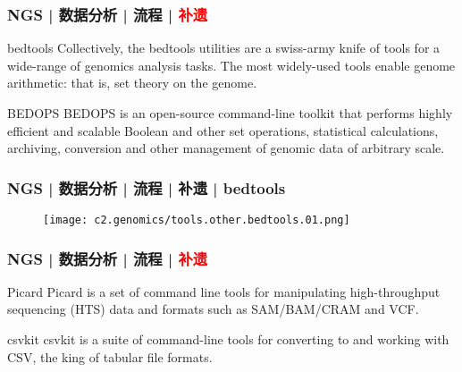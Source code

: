 \begin{frame}
  \frametitle{NGS | 数据分析 | 流程 | \textcolor{red}{补遗}}
  \begin{block}{bedtools}
    Collectively, the bedtools utilities are a swiss-army knife of tools for a wide-range of genomics analysis tasks. The most widely-used tools enable genome arithmetic: that is, set theory on the genome.
  \end{block}
  \pause
  \begin{block}{BEDOPS}
    BEDOPS is an open-source command-line toolkit that performs highly efficient and scalable Boolean and other set operations, statistical calculations, archiving, conversion and other management of genomic data of arbitrary scale.
  \end{block}
\end{frame}

\begin{frame}
  \frametitle{NGS | 数据分析 | 流程 | 补遗 | bedtools}
  \begin{figure}
    \centering
    \texttt{[image: c2.genomics/tools.other.bedtools.01.png]}
  \end{figure}
\end{frame}

\begin{frame}
  \frametitle{NGS | 数据分析 | 流程 | \textcolor{red}{补遗}}
  \begin{block}{Picard}
    Picard is a set of command line tools for manipulating high-throughput sequencing (HTS) data and formats such as SAM/BAM/CRAM and VCF.
  \end{block}
  \pause
  \begin{block}{csvkit}
    csvkit is a suite of command-line tools for converting to and working with CSV, the king of tabular file formats.
  \end{block}
\end{frame}

